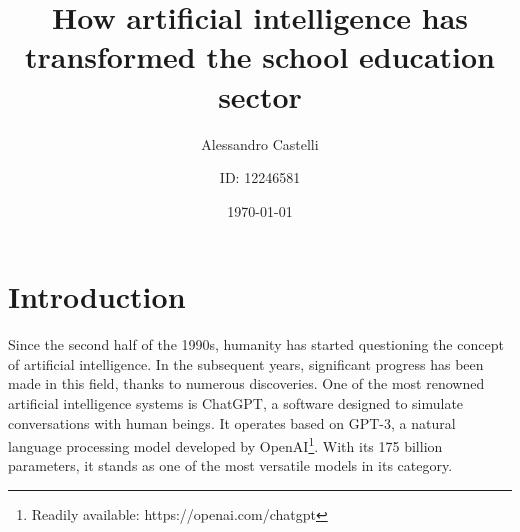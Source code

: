 \documentclass[a4paper,12pt]{article}
\title{How artificial intelligence has transformed the school education sector}
\author{Alessandro Castelli \and ID: 12246581}
\date{\today}
\begin{document}

\maketitle  %
\thispagestyle{empty}   %
\pagebreak  %

\cftsetpnumwidth{0.5cm} %
\renewcommand{\cftsecdotsep}{4} %
\tableofcontents    %


\setcounter{page}{1}    %
\newpage    %

\section{Introduction}  %
Since the second half of the 1990s, humanity has started questioning the concept of artificial intelligence. In the subsequent years, significant progress has been made in this field, thanks to numerous discoveries. One of the most renowned artificial intelligence systems is ChatGPT, a software designed to simulate conversations with human beings. It operates based on GPT-3, a natural language processing model developed by OpenAI\footnote{Readily available: https://openai.com/chatgpt}. With its 175 billion parameters, it stands as one of the most versatile models in its category.
\begin{comment}
Fin dalla seconda metà degli anni 90 del secolo precedente l'umanità ha inziato ad interrogarsi sul concetto di intelligenza artificiale.Negli anni seguenti grazie alle innumerevoli scoperte in quel campo sono stati fatti grandi progressi.\\Uno dei sistemi di intelligenza artificale più famosi è ChatGPT, un software progettato per simulare una conversazione con un essere umano. Il suo funzionamento si basa su GPT-3, un modello di elaborazione del linguaggio naturale sviluppato da OpenAI. I suoi 175 miliardi di parametri lo rendono uno dei modelli più versatili della categoria.
\end{comment}
\end{document}
